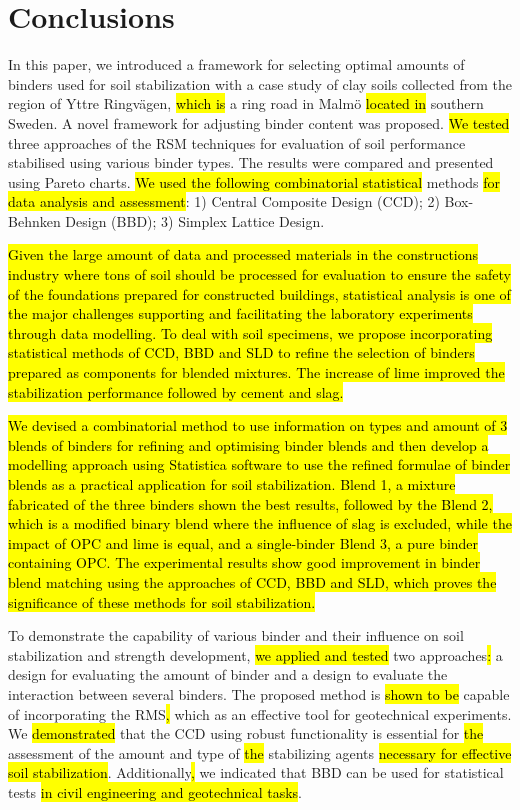 \documentclass[eprint,
]{actapoly}
\begin{document}
\section{Conclusions}
In this paper, we introduced a framework for selecting optimal amounts of binders used for soil stabilization with a case study of clay soils collected from the region of Yttre Ringvägen, \hl{which is }a ring road in Malmö\hl{ located in }southern Sweden. A novel framework for adjusting binder content was proposed. \hl{We tested }three approaches of the RSM techniques\hl{ }for evaluation of soil performance stabilised using various binder types. The results were compared and presented using Pareto charts. \hl{We used the following combinatorial statistical }methods \hl{for data analysis and assessment}: 1) Central Composite Design (CCD); 2) Box-Behnken Design (BBD); 3) Simplex Lattice Design. 

\hl{Given the large amount of data and processed materials in the constructions industry where tons of soil should be processed for evaluation to ensure the safety of the foundations prepared for constructed buildings, statistical analysis is one of the major challenges supporting and facilitating the laboratory experiments through data modelling. To deal with soil specimens, we propose incorporating statistical methods of CCD, BBD and SLD to refine the selection of binders prepared as components for blended mixtures. The increase of lime improved the stabilization performance followed by cement and slag. } 

\hl{ We devised a combinatorial method to use information on types and amount of 3 blends of binders for refining and optimising binder blends and then develop a modelling approach using Statistica software to use the refined formulae of binder blends as a practical application for soil stabilization. Blend 1, a mixture fabricated of the three binders shown the best results, followed by the Blend 2, which is a modified binary blend where the influence of slag is excluded, while the impact of OPC and lime is equal, and a single-binder Blend 3, a pure binder containing OPC. The experimental results show good improvement in binder blend matching using the approaches of CCD, BBD and SLD, which proves the significance of these methods for soil stabilization.}

To demonstrate the capability of various binder and their influence on soil stabilization and strength development, \hl{we applied and tested }two approaches\hl{: }a design for evaluating the amount of binder and a design to evaluate the interaction between several binders. The proposed method is \hl{shown to be }capable of incorporating the RMS\hl{, }which as an effective tool for geotechnical experiments. We \hl{demonstrated }that the CCD using\hl{ }robust functionality is essential for \hl{the }assessment of the amount and type of \hl{the }stabilizing agents \hl{necessary for effective soil stabilization}. Additionally\hl{, }we indicated that BBD can be used for statistical tests \hl{in civil engineering and geotechnical tasks}. 
\end{document}
